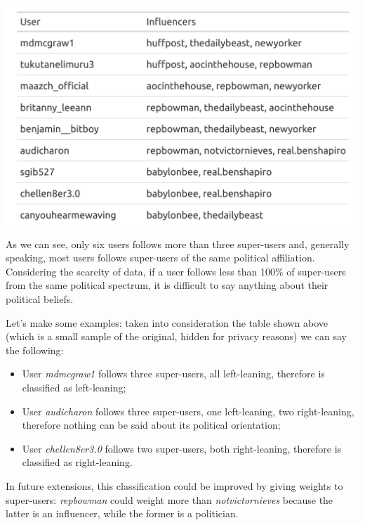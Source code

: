 \aCapo{}
\includegraphics[width = .5\textwidth]{images/final_privacy_table.png}

As we can see, only six users follows more than three super-users and, generally speaking, most users follows super-users of the same political affiliation. Considering the scarcity of data, if a user follows less than 100\% of super-users from the same political spectrum, it is difficult to say anything about their political beliefs.

Let's make some examples: taken into consideration the table shown above (which is a small sample of the original, hidden for privacy reasons) we can say the following:

\begin{itemize}
    \item User \textit{mdmcgraw1} follows three super-users, all left-leaning, therefore is classified as left-leaning;
    \item User \textit{audicharon} follows three super-users, one left-leaning, two right-leaning, therefore nothing can be said about its political orientation;
    \item User \textit{chellen8er3.0} follows two super-users, both right-leaning, therefore is classified as right-leaning.
\end{itemize}

In future extensions, this classification could be improved by giving weights to super-users: \textit{repbowman} could weight more than \textit{notvictornieves} because the latter is an influencer, while the former is a politician.
